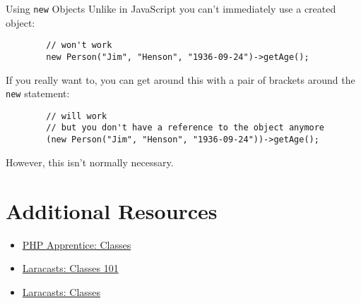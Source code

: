 \pagebreak

\begin{infobox}{Using \texttt{new} Objects}
    Unlike in JavaScript you can't immediately use a created object:

    \begin{verbatim}
        // won't work
        new Person("Jim", "Henson", "1936-09-24")->getAge();
    \end{verbatim}

    If you really want to, you can get around this with a pair of brackets around the \texttt{new} statement:

    \begin{verbatim}
        // will work
        // but you don't have a reference to the object anymore
        (new Person("Jim", "Henson", "1936-09-24"))->getAge();
    \end{verbatim}

    However, this isn't normally necessary.
\end{infobox}


\section{Additional Resources}

\begin{itemize}[leftmargin=*]
    \item \href{https://phpapprentice.com/classes.html}{PHP Apprentice: Classes}
    \item \href{https://laracasts.com/series/php-for-beginners/episodes/12}{Laracasts: Classes 101}
    \item \href{https://laracasts.com/series/object-oriented-bootcamp-in-php/episodes/1}{Laracasts: Classes}
\end{itemize}
